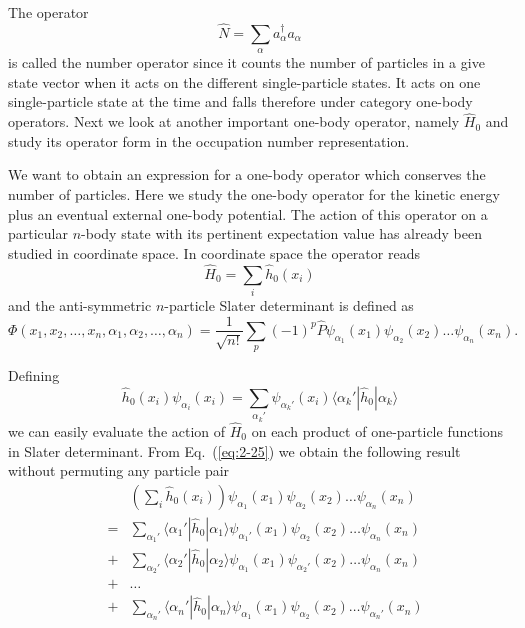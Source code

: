 \documentclass[graybox,sectrefs,envcountresetchap,open=right]{svmonodo}
\begin{document}
The operator 
\begin{equation}
	\hat{N} = \sum_\alpha a_\alpha^{\dagger} a_\alpha \label{eq:2-22}
\end{equation}
is called the number operator since it counts the number of particles in a give state vector when it acts 
on the different single-particle states.  It acts on one single-particle state at the time and falls 
therefore under category one-body operators.
Next we look at another important one-body operator, namely $\hat{H}_0$ and study its operator form in the 
occupation number representation.




We want to obtain an expression for a one-body operator which conserves the number of particles.
Here we study the one-body operator for the kinetic energy plus an eventual external one-body potential.
The action of this operator on a particular $n$-body state with its pertinent expectation value has already
been studied in coordinate  space.
In coordinate space the operator reads
\begin{equation}
	\hat{H}_0 = \sum_i \hat{h}_0(x_i) \label{eq:2-23}
\end{equation}
and the anti-symmetric $n$-particle Slater determinant is defined as 
\[
\Phi(x_1, x_2,\dots ,x_n,\alpha_1,\alpha_2,\dots, \alpha_n)= \frac{1}{\sqrt{n!}} \sum_p (-1)^p\hat{P}\psi_{\alpha_1}(x_1)\psi_{\alpha_2}(x_2) \dots \psi_{\alpha_n}(x_n).
\]




Defining
\begin{equation}
	\hat{h}_0(x_i) \psi_{\alpha_i}(x_i) = \sum_{\alpha_k'} \psi_{\alpha_k'}(x_i) \langle\alpha_k'|\hat{h}_0|\alpha_k\rangle \label{eq:2-25}
\end{equation}
we can easily  evaluate the action of $\hat{H}_0$ on each product of one-particle functions in Slater determinant.
From Eq.~(\ref{eq:2-25})  we obtain the following result without  permuting any particle pair 
\begin{eqnarray}
	&& \left( \sum_i \hat{h}_0(x_i) \right) \psi_{\alpha_1}(x_1)\psi_{\alpha_2}(x_2) \dots \psi_{\alpha_n}(x_n) \nonumber \\
	& =&\sum_{\alpha_1'} \langle \alpha_1'|\hat{h}_0|\alpha_1\rangle 
		\psi_{\alpha_1'}(x_1)\psi_{\alpha_2}(x_2) \dots \psi_{\alpha_n}(x_n) \nonumber \\
	&+&\sum_{\alpha_2'} \langle \alpha_2'|\hat{h}_0|\alpha_2\rangle
		\psi_{\alpha_1}(x_1)\psi_{\alpha_2'}(x_2) \dots \psi_{\alpha_n}(x_n) \nonumber \\
	&+& \dots \nonumber \\
	&+&\sum_{\alpha_n'} \langle \alpha_n'|\hat{h}_0|\alpha_n\rangle
		\psi_{\alpha_1}(x_1)\psi_{\alpha_2}(x_2) \dots \psi_{\alpha_n'}(x_n) \label{eq:2-26}
\end{eqnarray}
\end{document}
